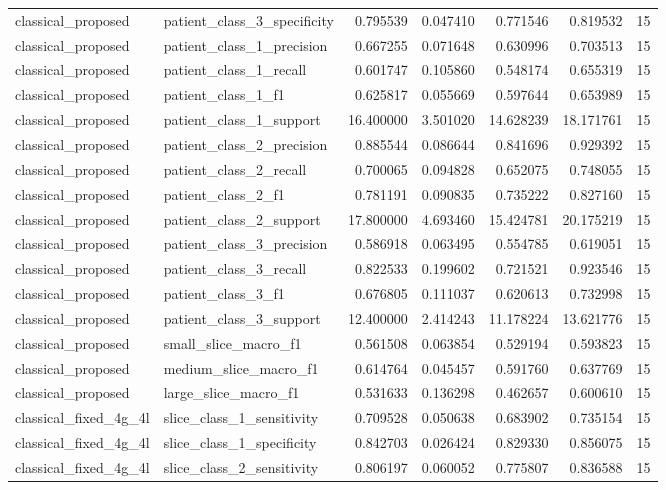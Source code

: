 \begin{tabular}{llrrrrr}
classical_proposed & patient_class_3_specificity & 0.795539 & 0.047410 & 0.771546 & 0.819532 & 15 \\
classical_proposed & patient_class_1_precision & 0.667255 & 0.071648 & 0.630996 & 0.703513 & 15 \\
classical_proposed & patient_class_1_recall & 0.601747 & 0.105860 & 0.548174 & 0.655319 & 15 \\
classical_proposed & patient_class_1_f1 & 0.625817 & 0.055669 & 0.597644 & 0.653989 & 15 \\
classical_proposed & patient_class_1_support & 16.400000 & 3.501020 & 14.628239 & 18.171761 & 15 \\
classical_proposed & patient_class_2_precision & 0.885544 & 0.086644 & 0.841696 & 0.929392 & 15 \\
classical_proposed & patient_class_2_recall & 0.700065 & 0.094828 & 0.652075 & 0.748055 & 15 \\
classical_proposed & patient_class_2_f1 & 0.781191 & 0.090835 & 0.735222 & 0.827160 & 15 \\
classical_proposed & patient_class_2_support & 17.800000 & 4.693460 & 15.424781 & 20.175219 & 15 \\
classical_proposed & patient_class_3_precision & 0.586918 & 0.063495 & 0.554785 & 0.619051 & 15 \\
classical_proposed & patient_class_3_recall & 0.822533 & 0.199602 & 0.721521 & 0.923546 & 15 \\
classical_proposed & patient_class_3_f1 & 0.676805 & 0.111037 & 0.620613 & 0.732998 & 15 \\
classical_proposed & patient_class_3_support & 12.400000 & 2.414243 & 11.178224 & 13.621776 & 15 \\
classical_proposed & small_slice_macro_f1 & 0.561508 & 0.063854 & 0.529194 & 0.593823 & 15 \\
classical_proposed & medium_slice_macro_f1 & 0.614764 & 0.045457 & 0.591760 & 0.637769 & 15 \\
classical_proposed & large_slice_macro_f1 & 0.531633 & 0.136298 & 0.462657 & 0.600610 & 15 \\
classical_fixed_4g_4l & slice_class_1_sensitivity & 0.709528 & 0.050638 & 0.683902 & 0.735154 & 15 \\
classical_fixed_4g_4l & slice_class_1_specificity & 0.842703 & 0.026424 & 0.829330 & 0.856075 & 15 \\
classical_fixed_4g_4l & slice_class_2_sensitivity & 0.806197 & 0.060052 & 0.775807 & 0.836588 & 15 \\

\end{tabular}
